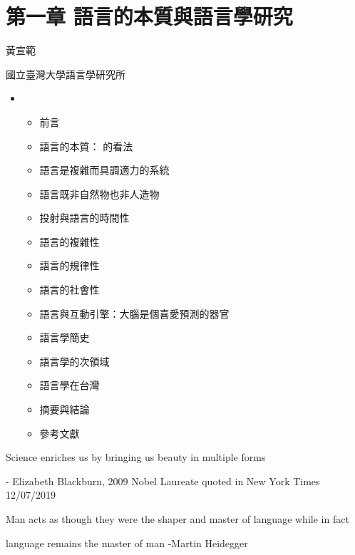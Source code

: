 
\chapter{第一章  語言的本質與語言學研究} 

黃宣範

國立臺灣大學語言學研究所

\begin{itemize}
\item \begin{itemize}
\item 前言

\item 語言的本質：\citet{Hockett1960} 的看法

\item 語言是複雜而具調適力的系統

\item 語言既非自然物也非人造物

\item 投射與語言的時間性

\item 語言的複雜性

\item 語言的規律性

\item 語言的社會性

\item 語言與互動引擎：大腦是個喜愛預測的器官

\item 語言學簡史

\item 語言學的次領域

\item 語言學在台灣

\item 摘要與結論

\item 參考文獻

\end{itemize}
\end{itemize}

Science enriches us by bringing us beauty in multiple forms

{}- Elizabeth Blackburn, 2009 Nobel Laureate                                              quoted in New York Times 12/07/2019

Man acts as though they were the shaper and master of language while in fact  

language remains the master of man                                                                                              {}-Martin Heidegger

